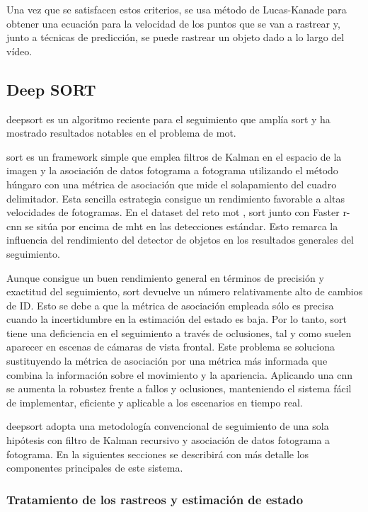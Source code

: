 Una vez que se satisfacen estos criterios, se usa método de Lucas-Kanade para obtener una ecuación para la velocidad de los puntos que se van a rastrear y, junto a técnicas de predicción, se puede rastrear un objeto dado a lo largo del vídeo.

\subsection{Deep SORT}
\label{subsec:deepsort-algorithm}

\gls{deepsort} \cite{Wojke2017simple} es un algoritmo reciente para el seguimiento que amplía \gls{sort} \cite{Bewley_2016} y ha mostrado resultados notables en el problema de \gls{mot}.

\gls{sort} es un framework simple que emplea filtros de Kalman en el espacio de la imagen y la asociación de datos fotograma a fotograma utilizando el método húngaro con una métrica de asociación que mide el solapamiento del cuadro delimitador. Esta sencilla estrategia consigue un rendimiento favorable a altas velocidades de fotogramas. En el dataset del reto \gls{mot} \cite{lealtaixe2015motchallenge}, \gls{sort} junto con Faster \gls{r-cnn} se sitúa por encima de \gls{mht} en las detecciones estándar. Esto remarca la influencia del rendimiento del detector de objetos en los resultados generales del seguimiento.

Aunque consigue un buen rendimiento general en términos de precisión y exactitud del seguimiento, \gls{sort} devuelve un número relativamente alto de cambios de ID. Esto se debe a que la métrica de asociación empleada sólo es precisa cuando la incertidumbre en la estimación del estado es baja. Por lo tanto, \gls{sort} tiene una deficiencia en el seguimiento a través de oclusiones, tal y como suelen aparecer en escenas de cámaras de vista frontal. Este problema se soluciona sustituyendo la métrica de asociación por una métrica más informada que combina la información sobre el movimiento y la apariencia. Aplicando una \gls{cnn} se aumenta la robustez frente a fallos y oclusiones, manteniendo el sistema fácil de implementar, eficiente y aplicable a los escenarios en tiempo real.

\gls{deepsort} adopta una metodología convencional de seguimiento de una sola hipótesis con filtro de Kalman recursivo y asociación de datos fotograma a fotograma. En la siguientes secciones se describirá con más detalle los componentes principales de este sistema.

\subsubsection*{Tratamiento de los rastreos y estimación de estado}
\label{subsubsec:track-handling-and-state-estimation}

